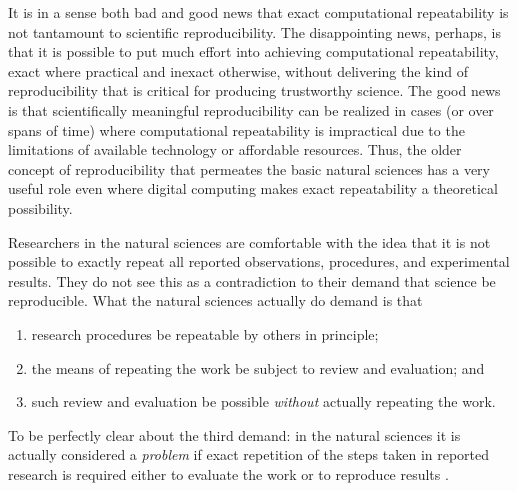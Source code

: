 It is in a sense both bad and good news that exact computational repeatability is not tantamount to scientific reproducibility.
The disappointing news, perhaps, is that it is possible to put much effort into achieving computational repeatability,
	exact where practical and inexact otherwise,
	without delivering the kind of reproducibility that is critical for producing trustworthy science.
The good news is that scientifically meaningful reproducibility can be realized in cases (or over spans of time)
	where computational repeatability is impractical due to the limitations of available technology or affordable resources.
Thus, the older concept of reproducibility that permeates the basic natural sciences has a very
	useful role even where digital computing makes exact repeatability a theoretical possibility.

 Researchers in the natural sciences are comfortable with the idea that it is not possible to exactly
	repeat all reported observations, procedures, and experimental results.
They do not see this as a contradiction to their demand that science be reproducible.
What the natural sciences actually do demand is that 
\begin{enumerate}
\item research procedures be repeatable by others in principle;
\item the means of repeating the work be subject to review and
  evaluation; and 
\item such review and evaluation be possible \emph{without}
  actually repeating the work.
\end{enumerate}
To be perfectly clear about the third demand: in the natural sciences
it is actually considered a \emph{problem} if exact repetition of the
steps taken in reported research is required either to evaluate the
work or to reproduce results \cite{milkowski2018replicability}. 
                       


